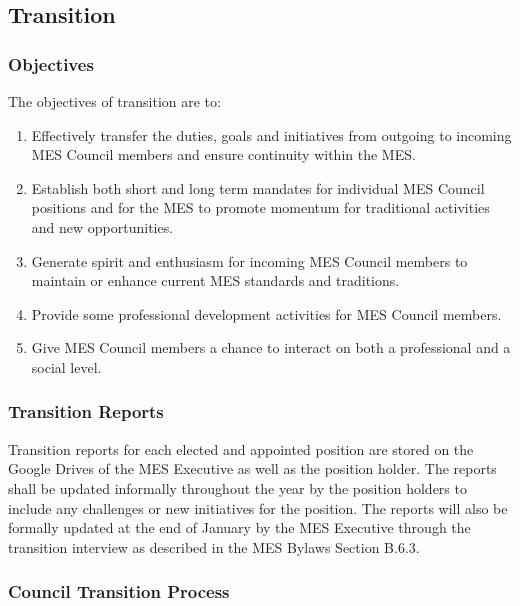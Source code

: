 \hypertarget{transition}{%
 \subsection{Transition}
 \label{transition}}

\hypertarget{objectives}{%
 \subsubsection{Objectives}
 \label{objectives}}
The objectives of transition are to:

\begin{enumerate}
 \item
  Effectively transfer the duties, goals and initiatives from outgoing
  to incoming MES Council members and ensure continuity within the MES.
 \item
  Establish both short and long term mandates for individual MES Council
  positions and for the MES to promote momentum for traditional
  activities and new opportunities.
 \item
  Generate spirit and enthusiasm for incoming MES Council members to
  maintain or enhance current MES standards and traditions.
 \item
  Provide some professional development activities for MES Council
  members.
 \item
  Give MES Council members a chance to interact on both a professional
  and a social level.

\end{enumerate}

\hypertarget{transition-reports}{%
 \subsubsection{Transition Reports}
 \label{transition-reports}}
Transition reports for each elected and appointed position are stored on
the Google Drives of the MES Executive as well as the position holder.
The reports shall be updated informally throughout the year by the
position holders to include any challenges or new initiatives for the
position. The reports will also be formally updated at the end of
January by the MES Executive through the transition interview as
described in the MES Bylaws Section B.6.3.

\hypertarget{council-transition-process}{%
 \subsubsection{Council Transition
  Process}
 \label{council-transition-process}}

